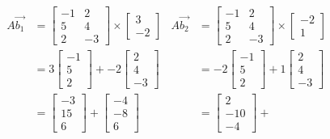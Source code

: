 \documentclass[11pt]{scrartcl}
\theoremstyle{dotlessP}
\theoremstyle{dotlessN}
\begin{document}
\begin{align*}
	A\vec{b_1} &= \begin{bmatrix}
            -1 & 2 \\ 5 & 4 \\ 2 & -3 
        \end{bmatrix} \times
		\begin{bmatrix}
			3 \\
			-2
		\end{bmatrix} &
		A\vec{b_2} &= \begin{bmatrix}
            -1 & 2 \\ 5 & 4 \\ 2 & -3 
        \end{bmatrix} \times 
		\begin{bmatrix}
			-2 \\
			1
		\end{bmatrix} \\
			 &= 3 
			 \begin{bmatrix}
			 	-1 \\
				5  \\
				2
			 \end{bmatrix} +
			 -2 
			 \begin{bmatrix}
			 	2 \\
				4 \\
				-3
			 \end{bmatrix}
			&
			&= 
			-2
			\begin{bmatrix}
				-1 \\
				5 \\
				2
			\end{bmatrix} +
			1
			\begin{bmatrix}
				2 \\
				4 \\
				-3
			\end{bmatrix} \\
			&= 
			\begin{bmatrix}
				-3 \\
				15 \\
				6
			\end{bmatrix} +
			\begin{bmatrix}
				-4 \\
				-8 \\
				6
			\end{bmatrix}
		&
		&= 
		\begin{bmatrix}
			2 \\
			-10 \\
			-4
		\end{bmatrix} +

\end{align*}
\end{document}
